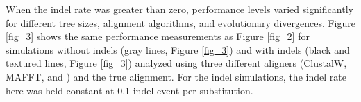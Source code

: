 When the indel rate was greater than zero, performance levels varied
significantly for different tree sizes, alignment algorithms, and
evolutionary divergences. Figure \ref{fig_3} shows the same
performance measurements as Figure \ref{fig_2} for simulations without
indels (gray lines, Figure \ref{fig_3}) and with indels (black and
textured lines, Figure \ref{fig_3}) analyzed using three different
aligners (ClustalW, MAFFT, and \prankc) and the true
alignment.  For the
indel simulations, the indel rate here was held constant at 0.1 indel
event per substitution.
